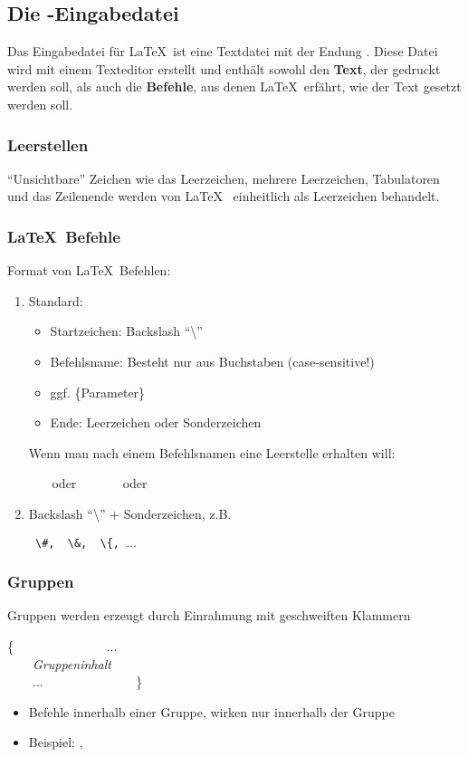 \subsection{Die -Eingabedatei}
Das Eingabedatei für \LaTeX~ist eine Textdatei mit der Endung . Diese Datei wird mit einem Texteditor erstellt und enthält sowohl den \textbf{Text}, der gedruckt werden soll, als auch die \textbf{Befehle}, aus denen \LaTeX~erfährt, wie der Text gesetzt werden soll.
%
\subsubsection{Leerstellen}
``Unsichtbare'' Zeichen wie das Leerzeichen, mehrere Leerzeichen, Tabulatoren und das Zeilenende werden von \LaTeX~ einheitlich als Leerzeichen behandelt.
%
\subsubsection{\LaTeX~Befehle}
Format von \LaTeX~Befehlen:
\begin{enumerate}
	\item Standard:
	\begin{center}
	\end{center}
\begin{itemize}
	\item Startzeichen: Backslash ``\textbackslash''
	\item Befehlsname: Besteht nur aus Buchstaben (case-sensitive!)
	\item  ggf. \{Parameter\}
	\item Ende: Leerzeichen oder Sonderzeichen
\end{itemize}
	Wenn man nach einem Befehlsnamen eine Leerstelle erhalten will: 	
	\begin{center}
		~~~ oder~~~ ~~~ oder~~~ 
	\end{center}
\item Backslash ``\textbackslash'' + Sonderzeichen, z.B.
\begin{center}
\texttt{	\textbackslash\#,~~\textbackslash\&,~~\textbackslash\{, $\ldots$}
\end{center}
\end{enumerate}
%
\subsubsection{Gruppen}
Gruppen werden erzeugt durch Einrahmung mit geschweiften Klammern 
\begin{center}
	{		\color{red}\{ }
	~~~~~~~~~~~~~~...\\
	~~~~\textit{Gruppeninhalt}\\
	~~~~...~~~~~~~~~~~~~~
	{\color{red}\}
	}
\end{center}
\begin{itemize}
	\item Befehle innerhalb einer Gruppe, wirken nur innerhalb der Gruppe
	\item Beispiel: , 
\end{itemize}


